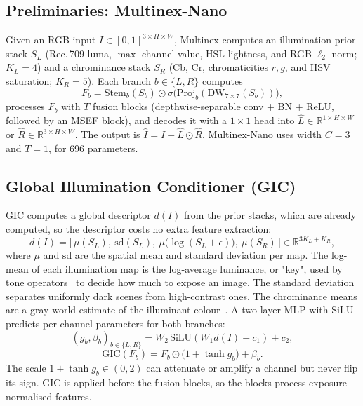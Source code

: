 \documentclass[10pt,twocolumn,letterpaper]{article}
\newcommand{\GIC}{\mathrm{GIC}}
\begin{document}
\subsection{Preliminaries: Multinex-Nano}
Given an RGB input $I\in[0,1]^{3\times H\times W}$, Multinex computes an illumination
prior stack $S_L$ (Rec.\,709 luma, $\max$-channel value, HSL lightness, and RGB $\ell_2$
norm; $K_L{=}4$) and a chrominance stack $S_R$ (Cb, Cr, chromaticities $r,g$, and HSV
saturation; $K_R{=}5$). Each branch $b\in\{L,R\}$ computes
\begin{equation}
  F_b = \mathrm{Stem}_b(S_b)\odot\sigma\!\big(\mathrm{Proj}_b(\mathrm{DW}_{7\times7}(S_b))\big),
\end{equation}
processes $F_b$ with $T$ fusion blocks (depthwise-separable conv + BN + ReLU,
followed by an MSEF block), and decodes it with a $1{\times}1$ head into
$\hat{L}\in\mathbb{R}^{1\times H\times W}$ or $\hat{R}\in\mathbb{R}^{3\times H\times W}$.
The output is $\hat{I}=I+\hat{L}\odot\hat{R}$. Multinex-Nano uses width $C{=}3$ and
$T{=}1$, for 696 parameters.

\subsection{Global Illumination Conditioner (GIC)}
GIC computes a global descriptor $d(I)$ from the prior stacks, which are already
computed, so the descriptor costs no extra feature extraction:
\begin{equation}
  d(I)=\Big[\,\mu(S_L),\ \mathrm{sd}(S_L),\ \mu\big(\log(S_L+\epsilon)\big),\ \mu(S_R)\,\Big]\in\mathbb{R}^{3K_L+K_R},
\end{equation}
where $\mu$ and $\mathrm{sd}$ are the spatial mean and standard deviation per map.
The log-mean of each illumination map is the log-average luminance, or "key",
used by tone operators~\cite{reinhard2002tone} to decide how much to expose an
image. The standard deviation separates uniformly dark scenes from high-contrast
ones. The chrominance means are a gray-world estimate of the illuminant
colour~\cite{buchsbaum1980grayworld}. A two-layer MLP with SiLU predicts
per-channel parameters for both branches:
\begin{equation}
  (g_b,\beta_b)_{b\in\{L,R\}}=W_2\,\mathrm{SiLU}(W_1 d(I)+c_1)+c_2,
\end{equation}
\begin{equation}
  \GIC(F_b)=F_b\odot\big(1+\tanh g_b\big)+\beta_b .
  \label{eq:gic}
\end{equation}
The scale $1+\tanh g_b\in(0,2)$ can attenuate or amplify a channel but never flip
its sign. GIC is applied before the fusion blocks, so the blocks process
exposure-normalised features.
\end{document}
